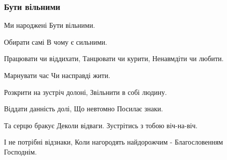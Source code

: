  
 
 

\subsubsection{Бути вільними}
\label{sec:poetry.rus.olesja_gavryshko.buty_vilnymy}

Ми народжені
Бути вільними.

Обирати самі
В чому є сильними.

Працювати чи віддихати,
Танцювати чи курити,
Ненавмдіти чи любити.

Марнувати час
Чи насправді жити.

Розкрити на зустріч долоні,
Звільнити в собі людину.

Віддати данність долі,
Що невтомно
Посилає знаки.

Та серцю бракує
Деколи відваги.
Зустрітись з тобою віч-на-віч.

І не потрібні відзнаки,
Коли нагородять найдорожчим -
Благословенням Господнім.
